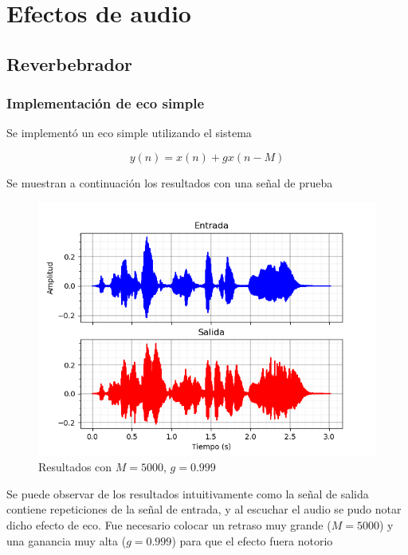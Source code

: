 \documentclass[assd_tp2_main.tex]{subfiles}
\begin{document}
\section{Efectos de audio}

\subsection{Reverbebrador}

\subsubsection{Implementación de eco simple}

Se implementó un eco simple utilizando el sistema

\begin{equation}
	y(n)=x(n)+gx(n-M)
\end{equation}

Se muestran a continuación los resultados con una señal de prueba

\begin{figure}[H]	
	\centering
	\includegraphics[scale=1]{graficos/EJ8/eco_simple.png}
	\caption{Resultados con $M=5000$, $g=0.999$ }
	\label{fig:bloqueElemental}
\end{figure}

Se puede observar de los resultados intuitivamente como la señal de salida contiene repeticiones de la señal de entrada, y al escuchar el audio se pudo notar dicho efecto de eco. Fue necesario colocar un retraso muy grande ($M=5000$) y una ganancia muy alta ($g=0.999$) para que el efecto fuera notorio
\end{document}
